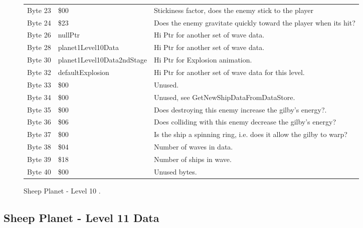 \begin{figure}[H]
{\begin{adjustbox}{width=12cm}
\begin{tabular}{lll}
 Byte 23 & \$00                        & Stickiness factor, does the enemy stick to the player              \\
 Byte 24 & \$23                        & Does the enemy gravitate quickly toward the player when its hit?   \\
 Byte 26 & nullPtr                    & Hi Ptr for another set of wave data.                               \\
 Byte 28 & planet1Level10Data         & Hi Ptr for another set of wave data.                               \\
 Byte 30 & planet1Level10Data2ndStage & Hi Ptr for Explosion animation.                                    \\
 Byte 32 & defaultExplosion           & Hi Ptr for another set of wave data for this level.                \\
 Byte 33 & \$00                        & Unused.                                                            \\
 Byte 34 & \$00                        & Unused, see GetNewShipDataFromDataStore.                           \\
 Byte 35 & \$00                        & Does destroying this enemy increase the gilby's energy?.           \\
 Byte 36 & \$06                        & Does colliding with this enemy decrease the gilby's energy?        \\
 Byte 37 & \$00                        & Is the ship a spinning ring, i.e. does it allow the gilby to warp? \\
 Byte 38 & \$04                        & Number of waves in data.                                           \\
 Byte 39 & \$18                        & Number of ships in wave.                                           \\
 Byte 40 & \$00                        & Unused bytes.                                                      \\
\bottomrule
\end{tabular}

  \end{adjustbox}

  }\caption*{Sheep Planet - Level 10
.}
\end{figure}

\clearpage
\subsection{Sheep Planet - Level 11 Data}

